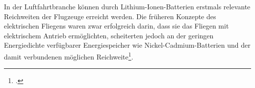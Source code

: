 In der Luftfahrtbranche können durch Lithium-Ionen-Batterien erstmals relevante Reichweiten der Flugzeuge erreicht werden.
Die früheren Konzepte des elektrischen Fliegens waren zwar erfolgreich darin, dass sie das Fliegen mit elektrischem Antrieb ermöglichten, scheiterten jedoch an der geringen Energiedichte verfügbarer Energiespeicher wie Nickel-Cadmium-Batterien und der damit verbundenen möglichen Reichweite\footcite[Vgl.][S. 4]{Hepperle2012}.\\

















%
%
%


